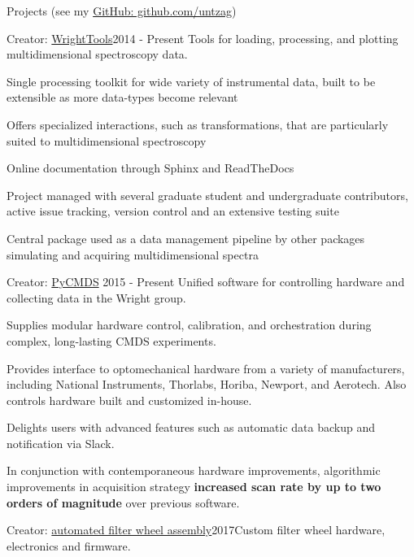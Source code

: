 \documentclass{resume}  %
\begin{document}
\clearpage

\begin{rSection}{Projects (see my \href{https://github.com/untzag}{GitHub: github.com/untzag})}
  \begin{rSubsection}{Creator: \href{http://wright.tools}{WrightTools}}{2014 - Present}
    {Tools for loading, processing, and plotting multidimensional spectroscopy data.}{}
    \item Single processing toolkit for wide variety of instrumental data, built to be extensible
      as more data-types become relevant
    \item Offers specialized interactions, such as transformations, that are particularly suited to
      multidimensional spectroscopy
    \item Online documentation through Sphinx and ReadTheDocs
    \item Project managed with several graduate student and undergraduate contributors, active
      issue tracking, version control and an extensive testing suite
    \item Central package used as a data management pipeline by other packages simulating and
      acquiring multidimensional spectra
  \end{rSubsection}
  \begin{rSubsection}{Creator: \href{https://github.com/wright-group/PyCMDS}{PyCMDS}}
    {2015 - Present}
    {Unified software for controlling hardware and collecting data in the Wright group.}{}
    \item Supplies modular hardware control, calibration, and orchestration during complex,
      long-lasting CMDS experiments.
    \item Provides interface to optomechanical hardware from a variety of manufacturers, including
      National Instruments, Thorlabs, Horiba, Newport, and Aerotech. Also controls hardware built
      and customized in-house.
    \item Delights users with advanced features such as automatic data backup and notification via
      Slack.
    \item In conjunction with contemporaneous hardware improvements, algorithmic improvements in
      acquisition strategy \textbf{increased scan rate by up to two orders of magnitude} over
      previous software.
  \end{rSubsection}
  \begin{rSubsection}{Creator: \href{https://github.com/wright-group/FilterWheels}{automated filter
        wheel assembly}}{2017}{Custom filter wheel hardware, electronics and firmware.}{}

\end{rSubsection}
\end{rSection}
\end{document}
